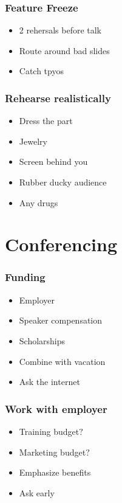 \documentclass{beamer}
\begin{document}
\begin{frame}[fragile]
\frametitle{Feature Freeze}
\begin{itemize}
\item 2 rehersals before talk
\item Route around bad slides
\item Catch tpyos
\end{itemize}
\end{frame}

\begin{frame}[fragile]
\frametitle{Rehearse realistically}
\begin{itemize}
\item Dress the part
\item Jewelry
\item Screen behind you
\item Rubber ducky audience
\item Any drugs
\end{itemize}
\end{frame}

\section{Conferencing}

\begin{frame}[fragile]
\tableofcontents[currentsection]
\end{frame}

\begin{frame}[fragile]
\frametitle{Funding}
\begin{itemize}
\item Employer
\item Speaker compensation
\item Scholarships
\item Combine with vacation
\item Ask the internet
\end{itemize}
\end{frame}

\begin{frame}[fragile]
\frametitle{Work with employer }
\begin{itemize}
\item Training budget$?$
\item Marketing budget$?$
\item Emphasize benefits
\item Ask early
\end{itemize}
\end{frame}
\end{document}

